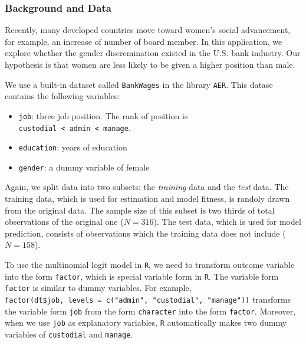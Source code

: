 \documentclass[
  12pt,
]{article}
\providecommand{\tightlist}{%
  \setlength{\itemsep}{0pt}\setlength{\parskip}{0pt}}
\begin{document}
\hypertarget{background-and-data-2}{%
\subsubsection{Background and Data}\label{background-and-data-2}}

Recently, many developed countries move toward women's social advancement, for example, an increase of number of board member.
In this application, we explore whether the gender discremination existed in the U.S. bank industry.
Our hypothesis is that women are less likely to be given a higher position than male.

We use a built-in dataset called \texttt{BankWages} in the library \texttt{AER}.
This datase contains the following variables:

\begin{itemize}
\tightlist
\item
  \texttt{job}: three job position. The rank of position is \texttt{custodial\ \textless{}\ admin\ \textless{}\ manage}.
\item
  \texttt{education}: years of education
\item
  \texttt{gender}: a dummy variable of female
\end{itemize}

Again, we split data into two subsets: the \emph{training} data and the \emph{test} data.
The training data, which is used for estimation and model fitness, is randoly drawn from the original data.
The sample size of this subset is two thirds of total observations of the original one (\(N = 316\)).
The test data, which is used for model prediction, consists of observations which the training data does not include (\(N = 158\)).

To use the multinomial logit model in \texttt{R},
we need to transform outcome variable into the form \texttt{factor}, which is special variable form in \texttt{R}.
The variable form \texttt{factor} is similar to dummy variables.
For example, \texttt{factor(dt\$job,\ levels\ =\ c("admin",\ "custodial",\ "manage"))}
transforms the variable form \texttt{job} from the form \texttt{character} into the form \texttt{factor}.
Moreover, when we use \texttt{job} as explanatory variables,
\texttt{R} automatically makes two dummy variables of \texttt{custodial} and \texttt{manage}.
\end{document}

